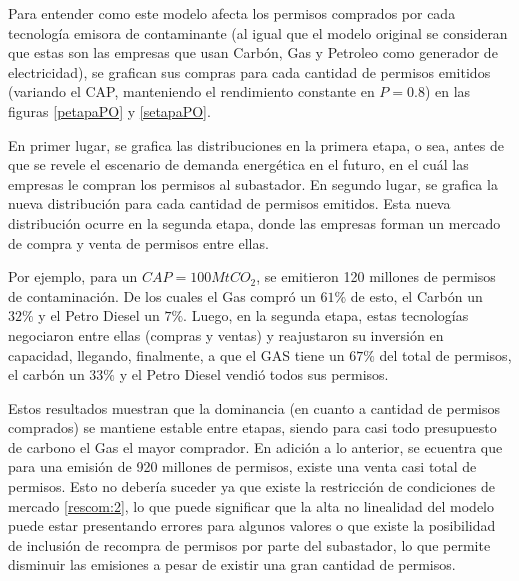 Para entender como este modelo afecta los permisos comprados por cada tecnología emisora de contaminante (al igual que el modelo original se consideran que estas son las empresas que usan Carbón, Gas y Petroleo como generador de electricidad), se grafican sus compras para cada cantidad de permisos emitidos (variando el CAP, manteniendo el rendimiento constante en $P=0.8$) en las figuras \ref{petapaPO} y \ref{setapaPO}.
\vspace{2.5mm}

En primer lugar, se grafica las distribuciones en la primera etapa, o sea, antes de que se revele el escenario de demanda energética en el futuro, en el cuál las empresas le compran los permisos al subastador. En segundo lugar, se grafica la nueva distribución para cada cantidad de permisos emitidos. Esta nueva distribución ocurre en la segunda etapa, donde las empresas forman un mercado de compra y venta de permisos entre ellas.
\vspace{2.5mm}

Por ejemplo, para un $CAP=100MtCO_2$, se emitieron 120 millones de permisos de contaminación. De los cuales el Gas compró un $61\%$ de esto, el Carbón un $32\%$ y el Petro Diesel un $7\%$. Luego, en la segunda etapa, estas tecnologías negociaron entre ellas (compras y ventas) y reajustaron su inversión en capacidad, llegando, finalmente, a que el GAS tiene un $67\%$ del total de permisos, el carbón un $33\%$ y el Petro Diesel vendió todos sus permisos. 
\vspace{2.5mm}

Estos resultados muestran que la dominancia (en cuanto a cantidad de permisos comprados) se mantiene estable entre etapas, siendo para casi todo presupuesto de carbono el Gas el mayor comprador. En adición a lo anterior, se ecuentra que para una emisión de 920 millones de permisos, existe una venta casi total de permisos. Esto no debería suceder ya que existe la restricción de condiciones de mercado \ref{rescom:2}, lo que puede significar que la alta no linealidad del modelo puede estar presentando errores para algunos valores o que existe la posibilidad de inclusión de recompra de permisos por parte del subastador, lo que permite disminuir las emisiones a pesar de existir una gran cantidad de permisos.
\vspace{2.5mm}

